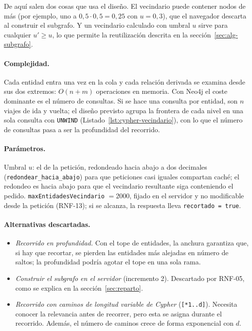 De aquí salen dos cosas que usa el diseño. El vecindario puede contener nodos de más (por ejemplo, uno a $0{,}5\cdot0{,}5=0{,}25$ con $u=0{,}3$), que el navegador descarta al construir el subgrafo. Y un vecindario calculado con umbral $u$ sirve para cualquier $u'\ge u$, lo que permite la reutilización descrita en la sección~\ref{sec:alg-subgrafo}.

\paragraph{Complejidad.} Cada entidad entra una vez en la cola y cada relación derivada se examina desde sus dos extremos: $O(n+m)$ operaciones en memoria. Con Neo4j el coste dominante es el número de consultas. Si se hace una consulta por entidad, son $n$ viajes de ida y vuelta; el diseño previsto agrupa la frontera de cada nivel en una sola consulta con \texttt{UNWIND} (Listado~\ref{lst:cypher-vecindario}), con lo que el número de consultas pasa a ser la profundidad del recorrido. 

\paragraph{Parámetros.} Umbral $u$: el de la petición, redondeado hacia abajo a dos decimales (\texttt{redondear\_hacia\_abajo}) para que peticiones casi iguales compartan caché; el redondeo es hacia abajo para que el vecindario resultante siga conteniendo el pedido. \texttt{maxEntidadesVecindario} $=2000$, fijado en el servidor y no modificable desde la petición (RNF-13); si se alcanza, la respuesta lleva \texttt{recortado = true}.

\paragraph{Alternativas descartadas.}
\begin{itemize}
  \item \emph{Recorrido en profundidad.} Con el tope de entidades, la anchura garantiza que, si hay que recortar, se pierden las entidades más alejadas en número de saltos; la profundidad podría agotar el tope en una sola rama.
  \item \emph{Construir el subgrafo en el servidor} (incremento 2). Descartado por RNF-05, como se explica en la sección~\ref{sec:reparto}.
  \item \emph{Recorrido con caminos de longitud variable de Cypher} (\texttt{[*1..d]}). Necesita conocer la relevancia antes de recorrer, pero esta se asigna durante el recorrido. Además, el número de caminos crece de forma exponencial con $d$.
\end{itemize}

